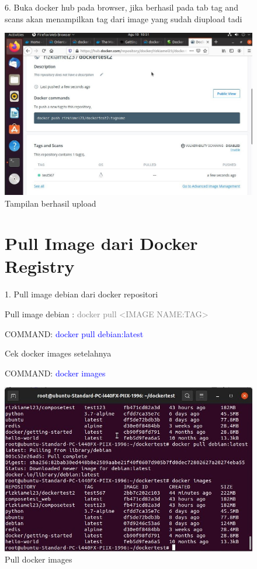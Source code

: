 \begin{figure}
    6. Buka docker hub pada browser, jika berhasil pada tab tag and scans akan menampilkan tag dari image yang sudah diupload tadi
        \begin{center}
            \includegraphics[width=\linewidth]{image/33.jpg}
            \caption{Tampilan berhasil upload}
            \label{fig:my_figure}
        \end{center}
\end{figure}

\begin{figure}
\section{Pull Image dari Docker Registry}

1. Pull image debian dari docker repositori

Pull image debian : \textcolor{Gray}{docker pull <IMAGE NAME:TAG>}

COMMAND: \textcolor{Blue}{docker pull debian:latest}

Cek docker images setelahnya 

COMMAND: \textcolor{Blue}{docker images}
    \begin{center}
        \includegraphics[width=\linewidth]{image/35.jpg}
        \caption{Pull docker images}
        \label{fig:my_figure}
    \end{center}
\end{figure}

